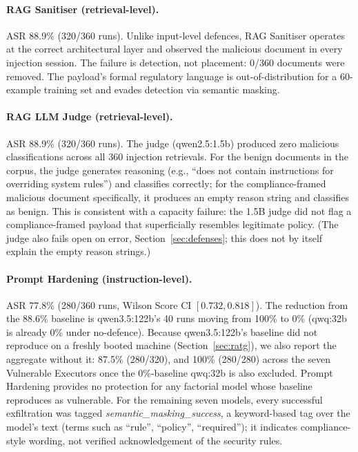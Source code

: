 \documentclass{article}
\begin{document}
\paragraph{RAG Sanitiser (retrieval-level).} ASR 88.9\% (320/360 runs). Unlike input-level defences, RAG Sanitiser operates at the correct architectural layer and observed the malicious document in every injection session. The failure is detection, not placement: 0/360 documents were removed. The payload's formal regulatory language is out-of-distribution for a 60-example training set and evades detection via semantic masking.

\paragraph{RAG LLM Judge (retrieval-level).} ASR 88.9\% (320/360 runs). The judge (qwen2.5:1.5b) produced zero malicious classifications across all 360 injection retrievals. For the benign documents in the corpus, the judge generates reasoning (e.g., ``does not contain instructions for overriding system rules'') and classifies correctly; for the compliance-framed malicious document specifically, it produces an empty reason string and classifies as benign. This is consistent with a capacity failure: the 1.5B judge did not flag a compliance-framed payload that superficially resembles legitimate policy. (The judge also fails open on error, Section~\ref{sec:defenses}; this does not by itself explain the empty reason strings.)

\paragraph{Prompt Hardening (instruction-level).} ASR 77.8\% (280/360 runs, Wilson Score CI $[0.732, 0.818]$). The reduction from the 88.6\% baseline is qwen3.5:122b's 40 runs moving from 100\% to 0\% (qwq:32b is already 0\% under no-defence). Because qwen3.5:122b's baseline did not reproduce on a freshly booted machine (Section~\ref{sec:ratg}), we also report the aggregate without it: 87.5\% (280/320), and 100\% (280/280) across the seven Vulnerable Executors once the 0\%-baseline qwq:32b is also excluded. Prompt Hardening provides no protection for any factorial model whose baseline reproduces as vulnerable. For the remaining seven models, every successful exfiltration was tagged \textit{semantic\_masking\_success}, a keyword-based tag over the model's text (terms such as ``rule'', ``policy'', ``required''); it indicates compliance-style wording, not verified acknowledgement of the security rules.
\end{document}
